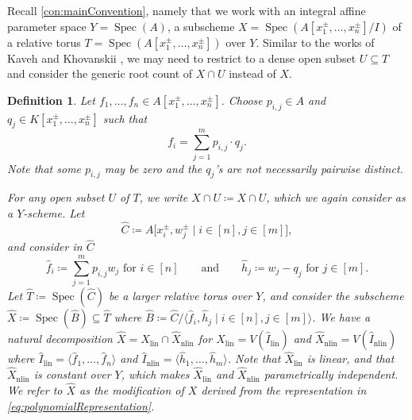 \documentclass[12pt,reqno,a4paper]{amsart}
\theoremstyle{theoremstyle}
\theoremstyle{examplestyle}
\newtheorem{definition}[theorem]{Definition}
\theoremstyle{algorithmstyle}
\newcommand{\lin}{{\mathrm{lin}}}
\newcommand{\nlin}{{\mathrm{nlin}}}
\DeclareMathOperator{\Spec}{Spec}
\begin{document}
Recall \cref{con:mainConvention}, namely that we work with an integral affine parameter space $Y=\Spec(A)$, a subscheme $X=\Spec(A[x_1^\pm,\dots,x_n^\pm]/I)$ of a relative torus $T=\Spec(A[x_1^\pm,\dots,x_n^\pm])$ over $Y$. Similar to the works of Kaveh and Khovanskii \cite{KavehKhovanskii2010,KavehKhovanskii2012}, we may need to restrict to a dense open subset $U\subseteq T$ and consider the generic root count of $X\cap U$ instead of $X$.


\begin{definition}\label{def:UniversalModification}
  Let $f_1,\dots,f_n\in A[x_1^\pm,\dots,x_n^\pm]$. Choose $p_{i,j}\in{A}$ and $q_{j}\in K[x_{1}^{\pm},\dots,x_{n}^{\pm}]$ such that
  \begin{equation}\label{eq:polynomialRepresentation}
    f_i = \sum_{j=1}^m p_{i,j}\cdot q_{j}.
  \end{equation}
  Note that some $p_{i,j}$ may be zero and the $q_j$'s are not necessarily pairwise distinct.

  For any open subset $U$ of $T$, we write $X\cap U\coloneqq X\cap{U}$, which we again consider as a $Y$-scheme. Let
  \begin{equation*}
    \widehat C \coloneqq A\Big[x_i^\pm, w_{j}^\pm \mid i\in[n], j\in[m]\Big],
  \end{equation*}
  and consider in $\widehat C$
  \begin{equation*}
    \hat{f}_{i}\coloneqq\sum_{j=1}^{m} p_{i,j}w_{j} \text{ for } i\in[n]\qquad\text{and}\qquad \hat{h}_{j}\coloneqq w_{j}-q_{j} \text{ for } j\in[m].
  \end{equation*}
  Let $\widehat T\coloneqq\Spec(\widehat C)$ be a larger relative torus over $Y$, and consider the subscheme $\widehat X\coloneqq\Spec(\widehat B)\subseteq \widehat T$ where $\widehat B\coloneqq \widehat C/\langle\hat f_{i}, \hat h_{j}\mid i\in[n],j\in[m]\rangle$.  We have a natural decomposition $\widehat X=\widehat X_\lin\cap\widehat X_\nlin$ for $\widehat X_{\lin} = V(\widehat I_{\lin})$ and $\widehat X_{\nlin} = V(\widehat I_{\nlin})$ where $\widehat I_{\lin}=\langle \hat f_1,\dots,\hat f_n\rangle$ and $\widehat I_{\nlin} = \langle \hat h_{1},\dots,\hat h_m\rangle$. Note that $\widehat X_{\lin}$ is linear, and that $\widehat X_{\nlin}$ is constant over $Y$, which makes $\widehat X_{\lin}$ and $\widehat X_{\nlin}$ parametrically independent. We refer to $\widehat{X}$ as the \emph{modification} of $X$ derived from the representation in \cref{eq:polynomialRepresentation}.
\end{definition}
\end{document}
